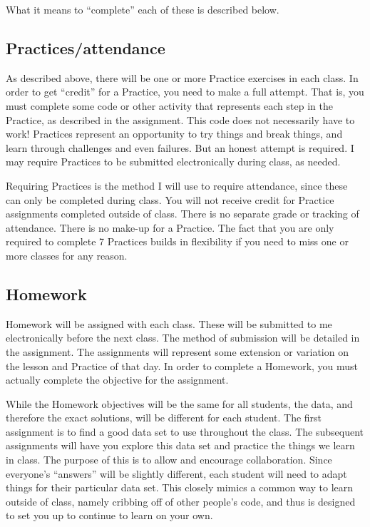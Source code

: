 \documentclass{tufte-handout}
\begin{document}
What it means to ``complete'' each of these is described below.
\subsection*{Practices/attendance}
\label{sec:org40ddcef}
As described above, there will be one or more Practice exercises in each class. In order to get ``credit'' for a Practice, you need to make a full attempt.  That is, you must complete some code or other activity that represents each step in the Practice, as described in the assignment.  This code does not necessarily have to work!  Practices represent an opportunity to try things and break things, and learn through challenges and even failures. But an honest attempt is required. I may require Practices to be submitted electronically during class, as needed.

Requiring Practices is the method I will use to require attendance, since these can only be completed during class.  You will not receive credit for Practice assignments completed outside of class. There is no separate grade or tracking of attendance.  There is no make-up for a Practice.  The fact that you are only required to complete 7 Practices builds in flexibility if you need to miss one or more classes for any reason. 
\subsection*{Homework}
\label{sec:orgb32560c}
Homework will be assigned with each class.  These will be submitted to me electronically before the next class.  The method of submission will be detailed in the assignment. The assignments will represent some extension or variation on the lesson and Practice of that day.  In order to complete a Homework, you must actually complete the objective for the assignment.  

While the Homework objectives will be the same for all students, the data, and therefore the exact solutions, will be different for each student.  The first assignment is to find a good data set to use throughout the class.  The subsequent assignments will have you explore this data set and practice the things we learn in class.  The purpose of this is to allow and encourage collaboration.  Since everyone's ``answers'' will be slightly different, each student will need to adapt things for their particular data set.  This closely mimics a common way to learn outside of class, namely cribbing off of other people's code, and thus is designed to set you up to continue to learn on your own.
\end{document}
